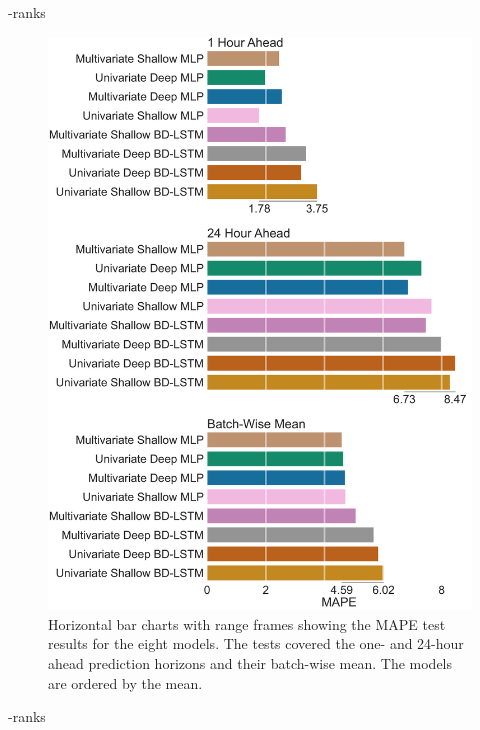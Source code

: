 \documentclass[mstat,12pt]{unswthesis}
\begin{document}
 \mape-ranks
 \mape

\begin{figure}[H]
\centerline{\includegraphics[width=\columnwidth]{Figures/Plots/Test MAPE results.pdf}}
\caption{Horizontal bar charts with range frames showing the MAPE test results for the eight models. The tests covered the one- and 24-hour ahead prediction horizons and their batch-wise mean. The models are ordered by the mean.}
\label{mape_viz}
\end{figure}

 \rmse-ranks
\newline
{} \rmse
\end{document}
